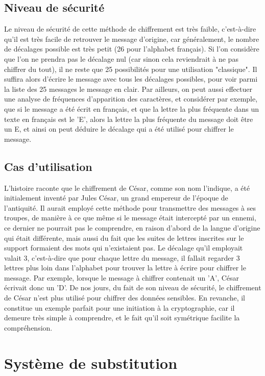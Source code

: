 		\subsection{Niveau de sécurité}
			Le niveau de sécurité de cette méthode de chiffrement est très faible, c'est-à-dire qu'il est très facile de retrouver le message d'origine, car généralement, le nombre de décalages possible est très petit (26 pour l'alphabet français). Si l'on considère que l'on ne prendra pas le décalage nul (car sinon cela reviendrait à ne pas chiffrer du tout), il ne reste que 25 possibilités pour une utilisation "classique". Il suffira alors d'écrire le message avec tous les décalages possibles, pour voir parmi la liste des 25 messages le message en clair. Par ailleurs, on peut aussi effectuer une analyse de fréquences d'apparition des caractères, et considérer par exemple, que si le message a été écrit en français, et que la lettre la plus fréquente dans un texte en français est le 'E', alors la lettre la plus fréquente du message doit être un E, et ainsi on peut déduire le décalage qui a été utilisé pour chiffrer le message.
		\subsection{Cas d'utilisation}
			L'histoire raconte que le chiffrement de César, comme son nom l'indique, a été initialement inventé par Jules César, un grand empereur de l'époque de l'antiquité. Il aurait employé cette méthode pour transmettre des messages à ses troupes, de manière à ce que même si le message était intercepté par un ennemi, ce dernier ne pourrait pas le comprendre, en raison d'abord de la langue d'origine qui était différente, mais aussi du fait que les suites de lettres inscrites sur le support formaient des mots qui n'existaient pas. Le décalage qu'il employait valait 3, c'est-à-dire que pour chaque lettre du message, il fallait regarder 3 lettres plus loin dans l'alphabet pour trouver la lettre à écrire pour chiffrer le message. Par exemple, lorsque le message à chiffrer contenait un 'A', César écrivait donc un 'D'.
			De nos jours, du fait de son niveau de sécurité, le chiffrement de César n'est plus utilisé pour chiffrer des données sensibles. En revanche, il constitue un exemple parfait pour une initiation à la cryptographie, car il demeure très simple à comprendre, et le fait qu'il soit symétrique facilite la compréhension.
	\section{Système de substitution}
